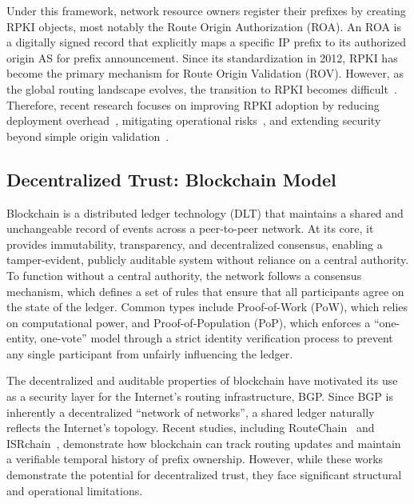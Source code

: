 \documentclass[conference]{IEEEtran}
\newcommand{\md}[1]{{\color{purple}#1}}
\begin{document}
\md{Under this framework, network resource owners register their prefixes by creating RPKI objects, most notably the Route Origin Authorization (ROA). An ROA is a digitally signed record that explicitly maps a specific IP prefix to its authorized origin AS for prefix announcement. Since its standardization in 2012, RPKI has become the primary mechanism for Route Origin Validation (ROV). However, as the global routing landscape evolves, the transition to RPKI becomes difficult~\cite{KangLRKC24IRRedicator, testart2020filter, nro2026rpki}. Therefore, recent research focuses on improving RPKI adoption by reducing deployment overhead~\cite{chung2019rpki, ni2025address}, mitigating operational risks~\cite{li2025improv, chen2025right}, and extending security beyond simple origin validation~\cite{hoger2025xbgpsec, rfc9234}.}


\subsection{Decentralized Trust: Blockchain Model}
\md{Blockchain is a distributed ledger technology (DLT) that maintains a shared and unchangeable record of events across a peer-to-peer network. At its core, it provides immutability, transparency, and decentralized consensus, enabling a tamper-evident, publicly auditable system without reliance on a central authority. To function without a central authority, the network follows a consensus mechanism, which defines a set of rules that ensure that all participants agree on the state of the ledger. Common types include Proof-of-Work (PoW), which relies on computational power, and Proof-of-Population (PoP), which enforces a ``one-entity, one-vote'' model through a strict identity verification process to prevent any single participant from unfairly influencing the ledger.}

\md{The decentralized and auditable properties of blockchain have motivated its use as a security layer for the Internet's routing infrastructure, BGP. Since BGP is inherently a decentralized ``network of networks'', a shared ledger naturally reflects the Internet's topology. Recent studies, including RouteChain~\cite{saad2022routechain} and ISRchain~\cite{chen2020isrchain}, demonstrate how blockchain can track routing updates and maintain a verifiable temporal history of prefix ownership. However, while these works demonstrate the potential for decentralized trust, they face significant structural and operational limitations.}
\fi
\end{document}
